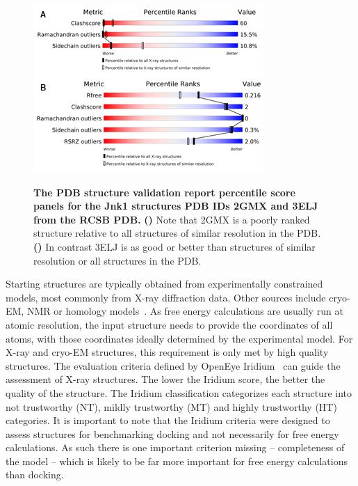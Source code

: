 \documentclass[9pt,bestpractices]{livecoms}
\begin{document}
\begin{figure}[!ht]
    \centering
    \includegraphics[width=.47\textwidth]{figures/crystal/pdb_validation.png}
    {
        \label{fig:jnk1_pdb_report_2gmx}
        \label{fig:jnk1_pdb_report_3eljx}
    }
    
    \caption{\textbf{The PDB structure validation report percentile score panels for the Jnk1 structures PDB IDs 2GMX and 3ELJ from the RCSB PDB.} \textbf{()} Note that 2GMX is a poorly ranked structure relative to all structures of similar resolution in the PDB.  
    \textbf{()} In contrast 3ELJ is as good or better than structures of similar resolution or all structures in the PDB.}
    \label{fig:jnk1_pdb_report}
\end{figure}


Starting structures are typically obtained from experimentally constrained models, most commonly from X-ray diffraction data.
Other sources include cryo-EM, NMR or homology models~\cite{courniaRelativeBindingFree2017,courniaRigorousFreeEnergy2020,schindler_largescale_2020}.
As free energy calculations are usually run at atomic resolution, the input structure needs to provide the coordinates of all atoms, with those coordinates ideally determined by the experimental model.
%
For X-ray and cryo-EM structures, this requirement is only met by high quality structures.
The evaluation criteria defined by OpenEye Iridium~\cite{warrenEssentialConsiderationsUsing2012} can guide the assessment of X-ray structures. The lower the Iridium score, the better the quality of the structure. The Iridium classification categorizes each structure into not trustworthy (NT),
mildly trustworthy (MT) and highly trustworthy (HT) categories. It is important to note that the Iridium criteria were designed to assess structures for benchmarking docking and not necessarily for free energy calculations. As such there is one important criterion missing -- completeness of the model -- which is likely to be far more important for free energy calculations than docking.
\end{document}
